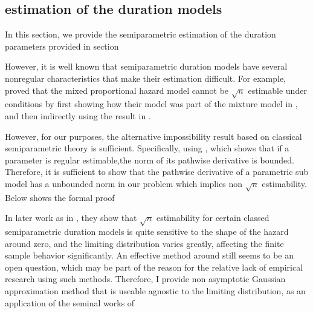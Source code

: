\documentclass{article}
\begin{document}
\subsection{ estimation of the duration models } 
In this section, we provide the semiparametric estimation of the duration parameters provided in  section \todo

However, it is well known that semiparametric duration models have several nonregular characteristics that make their estimation difficult. For example, \cite{hahn 1994} proved that the mixed proportional hazard model cannot be $ \sqrt {n} $ estimable under conditions by first showing how their model was part of the mixture model in \cite{chamberlain 1986} , and then indirectly using the result in\cite{ Pfanzagl  2000} . 

However, for our purposes, the alternative impossibility result based on classical semiparametric theory is sufficient. Specifically, using \cite{van der vaart 1991}, which shows that if a parameter is regular estimable,the norm of its pathwise derivative is bounded. Therefore, it is sufficient to show that the pathwise derivative of a parametric sub model has a unbounded norm in our problem which implies non $\sqrt{n} $ estimability. Below shows the formal proof \todo

In later work as in \cite{ridder and weid 2003} , they show that $\sqrt{n} $ estimability for certain classed semiparametric duration models is quite sensitive to the shape of the hazard around zero, and the limiting distribution varies greatly, affecting the finite sample behavior significantly. An effective method around still seems to be an open question, which may be part of the reason for the relative lack of empirical research using such methods. Therefore, I provide non asymptotic Gaussian approximation method that is useable agnostic to the limiting distribution, as an application of the seminal works of \cite{chernozhukov , 2012}




\end{document}
